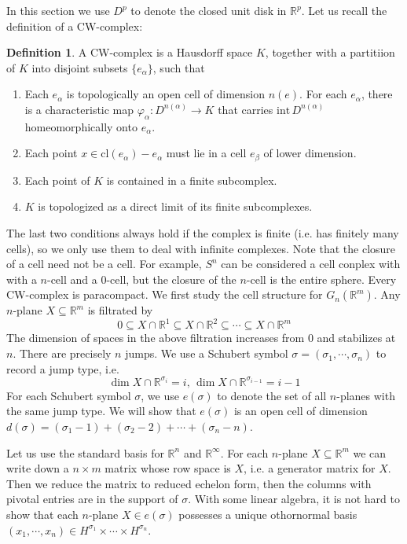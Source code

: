 \documentclass[12pt]{article}
\theoremstyle{plain}
\theoremstyle{definition}
\newtheorem{definition}[equation]{Definition}
\newcommand{\IR}{\mathbb{R}}
\newcommand{\<}{\langle}
\renewcommand{\>}{\rangle}
\newcommand{\cl}{\mathrm{cl}}
\newcommand{\intr}{\mathrm{int}\,}
\begin{document}
In this section we use $D^p$ to denote the closed unit disk in $\IR^p$. 
Let us recall the definition of a CW-complex:
\begin{definition} A CW-complex is a Hausdorff space $K$, together with a partitiion of $K$ into disjoint subsets $\{ e_\alpha \}$, such that 
\begin{enumerate}
\item Each $e_\alpha$ is topologically an open cell of dimension $n(e)$. For each $e_\alpha$, there is a characteristic map $\varphi_\alpha : D^{n(\alpha)} \to K$ that carries $\intr D^{n(\alpha)}$ homeomorphically onto $e_\alpha$. 
\item Each point $x \in \cl(e_\alpha) - e_\alpha$ must lie in a cell $e_\beta$ of lower dimension. 
\item Each point of $K$ is contained in a finite subcomplex. 
\item $K$ is topologized as a direct limit of its finite subcomplexes. 
\end{enumerate}
\end{definition}
The last two conditions always hold if the complex is finite (i.e. has finitely many cells), so we only use them to deal with infinite complexes. 
Note that the closure of a cell need not be a cell. For example, $S^n$ can be considered a cell conplex with with a $n$-cell and a $0$-cell, but the closure of the $n$-cell is the entire sphere. Every CW-complex is paracompact. 
We first study the cell structure for $G_n(\IR^m)$. Any $n$-plane $X \subseteq \IR^m$ is filtrated by 
$$0 \subseteq X \cap \IR^1 \subseteq X \cap \IR^2 \subseteq \cdots \subseteq X \cap \IR^m $$ 
The dimension of spaces in the above filtration increases from $0$ and stabilizes at $n$. There are precisely $n$ jumps. We use a Schubert symbol $\sigma = ( \sigma_1, \cdots, \sigma_n)$ to record a jump type, i.e. $$ \dim X \cap \IR^{\sigma_i} = i, \, \dim X \cap \IR^{\sigma_{i-1}} = i - 1$$
For each Schubert symbol $\sigma$, we use $e(\sigma)$ to denote the set of all $n$-planes with the same jump type. We will show that $e(\sigma)$ is an open cell of dimension $d(\sigma) = (\sigma_1 - 1) + (\sigma_2 - 2) + \cdots + (\sigma_n - n)$. 

Let us use the standard basis for $\IR^n$ and $\IR^\infty$. For each $n$-plane $X \subseteq \IR^m$ we can write down a $n \times m$ matrix whose row space is $X$, i.e. a generator matrix for $X$. Then we reduce the matrix to reduced echelon form, then the columns with pivotal entries are in the support of $\sigma$. With some linear algebra, it is not hard to show that each $n$-plane $X \in e(\sigma)$ possesses a unique othornormal basis $(x_1, \cdots, x_n) \in H^{\sigma_1} \times \cdots \times H^{\sigma_n}$. 
\end{document}

